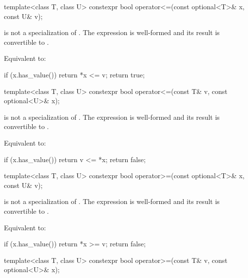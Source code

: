 %
\begin{itemdecl}
template<class T, class U> constexpr bool operator<=(const optional<T>& x, const U& v);
\end{itemdecl}

\begin{itemdescr}
\pnum
\constraints
{} is not a specialization of .
The expression  is well-formed and
its result is convertible to .

\pnum
\effects
Equivalent to:
\begin{codeblock}
if (x.has_value())
  return *x <= v;
return true;
\end{codeblock}
\end{itemdescr}

%
\begin{itemdecl}
template<class T, class U> constexpr bool operator<=(const T& v, const optional<U>& x);
\end{itemdecl}

\begin{itemdescr}
\pnum
\constraints
{} is not a specialization of .
The expression  is well-formed and
its result is convertible to .

\pnum
\effects
Equivalent to:
\begin{codeblock}
if (x.has_value())
  return v <= *x;
return false;
\end{codeblock}
\end{itemdescr}

%
\begin{itemdecl}
template<class T, class U> constexpr bool operator>=(const optional<T>& x, const U& v);
\end{itemdecl}

\begin{itemdescr}
\pnum
\constraints
{} is not a specialization of .
The expression  is well-formed and
its result is convertible to .

\pnum
\effects
Equivalent to:
\begin{codeblock}
if (x.has_value())
  return *x >= v;
return false;
\end{codeblock}
\end{itemdescr}

%
\begin{itemdecl}
template<class T, class U> constexpr bool operator>=(const T& v, const optional<U>& x);
\end{itemdecl}

